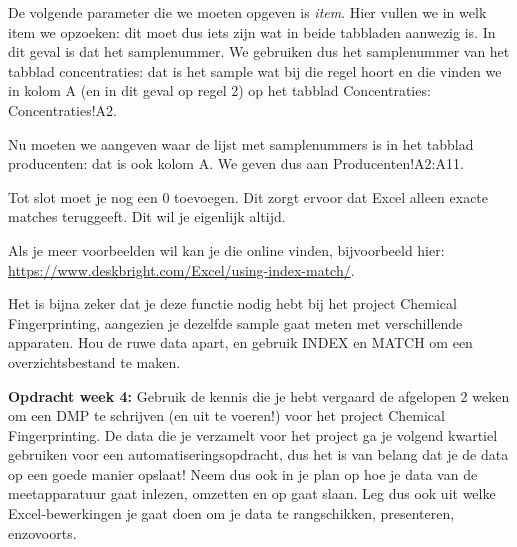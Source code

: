De volgende parameter die we moeten opgeven is \textit{item}. Hier vullen we in welk item we opzoeken: dit moet dus iets zijn wat in beide tabbladen aanwezig is. In dit geval is dat het samplenummer. We gebruiken dus het samplenummer van het tabblad concentraties: dat is het sample wat bij die regel hoort en die vinden we in kolom A (en in dit geval op regel 2) op het tabblad Concentraties: Concentraties!A2.

Nu moeten we aangeven waar de lijst met samplenummers is in het tabblad producenten: dat is ook kolom A. We geven dus aan Producenten!A2:A11. 

Tot slot moet je nog een 0 toevoegen. Dit zorgt ervoor dat Excel alleen exacte matches teruggeeft. Dit wil je eigenlijk altijd. 

Als je meer voorbeelden wil kan je die online vinden, bijvoorbeeld hier:\\
\href{https://www.deskbright.com/Excel/using-index-match/}{\textsf{https://www.deskbright.com/Excel/using-index-match/}}. 

Het is bijna zeker dat je deze functie nodig hebt bij het project Chemical Fingerprinting, aangezien je dezelfde sample gaat meten met verschillende apparaten. Hou de ruwe data apart, en gebruik INDEX en MATCH om een overzichtsbestand te maken.

\color{saxion}\textbf{Opdracht week 4: }\color{black} Gebruik de kennis die je hebt vergaard de afgelopen 2 weken om een DMP te schrijven (en uit te voeren!) voor het project Chemical Fingerprinting. De data die je verzamelt voor het project ga je volgend kwartiel gebruiken voor een automatiseringsopdracht, dus het is van belang dat je de data op een goede manier opslaat! Neem dus ook in je plan op hoe je data van de meetapparatuur gaat inlezen, omzetten en op gaat slaan. Leg dus ook uit welke Excel-bewerkingen je gaat doen om je data te rangschikken, presenteren, enzovoorts. 